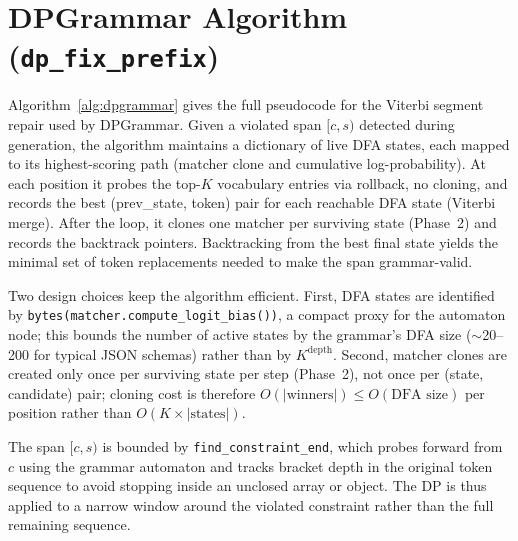 \appendix

\section{DPGrammar Algorithm (\texttt{dp\_fix\_prefix})}
\label{app:alg}

Algorithm~\ref{alg:dpgrammar} gives the full pseudocode for the Viterbi segment repair used by DPGrammar.
Given a violated span $[c,s)$ detected during generation, the algorithm maintains a dictionary of live DFA states, each mapped to its highest-scoring path (matcher clone and cumulative log-probability).
At each position it probes the top-$K$ vocabulary entries via rollback, no cloning, and records the best (prev\_state, token) pair for each reachable DFA state (Viterbi merge).
After the loop, it clones one matcher per surviving state (Phase~2) and records the backtrack pointers.
Backtracking from the best final state yields the minimal set of token replacements needed to make the span grammar-valid.

Two design choices keep the algorithm efficient.
First, DFA states are identified by \texttt{bytes(matcher.compute\_logit\_bias())}, a compact proxy for the automaton node; this bounds the number of active states by the grammar's DFA size ($\sim$20--200 for typical JSON schemas) rather than by $K^{\text{depth}}$.
Second, matcher clones are created only once per surviving state per step (Phase~2), not once per (state, candidate) pair; cloning cost is therefore $O(|\text{winners}|) \leq O(\text{DFA size})$ per position rather than $O(K \times |\text{states}|)$.

The span $[c,s)$ is bounded by \texttt{find\_constraint\_end}, which probes forward from $c$ using the grammar automaton and tracks bracket depth in the original token sequence to avoid stopping inside an unclosed array or object.
The DP is thus applied to a narrow window around the violated constraint rather than the full remaining sequence.

